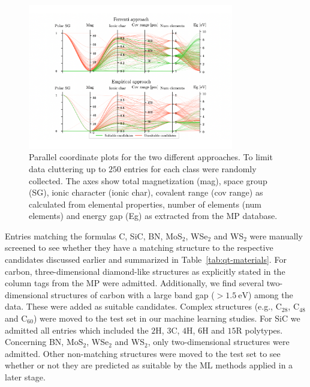 \documentclass[superscriptaddress,
preprint,
 amsmath,amssymb,
 aps,
]{revtex4-2}
\begin{document}
\begin{figure}[t] %
    \centering
    \includegraphics[width=0.8\textwidth]{figure3.pdf}
    \caption{Parallel coordinate plots for the two different approaches. To limit data cluttering up to $250$ entries for each class were randomly collected.  
    The axes show total magnetization (mag), space group (SG), ionic character (ionic char), covalent range (cov range) as calculated from elemental properties, number of elements (num elements) and energy gap (Eg) as extracted from the MP database.} 
    \label{fig:parallel-coordinates-approaches}
\end{figure}

Entries matching the formulas C, SiC, BN, MoS$_2$, WSe$_2$ and WS$_2$ were manually screened to see whether they have a matching structure to the respective candidates discussed earlier and summarized in Table~\ref{tab:qt-materials}. 
For carbon, three-dimensional diamond-like structures as explicitly stated in the column tags from the MP were admitted. Additionally, we find several two-dimensional structures of carbon with a large band gap ($>\SI{1.5}{\electronvolt}$) among the data. These were added as suitable candidates. Complex structures (e.g., C$_{28}$, C$_{48}$ and C$_{60}$) were moved to the test set in our machine learning studies. For SiC we admitted all entries which included the $2$H, $3$C, $4$H, $6$H and $15$R polytypes. Concerning BN, MoS$_2$, WSe$_2$ and WS$_2$, only two-dimensional structures were admitted. 
Other non-matching structures were moved to the test set to see whether or not they are predicted as suitable by the ML methods applied in a later stage.
\end{document}
